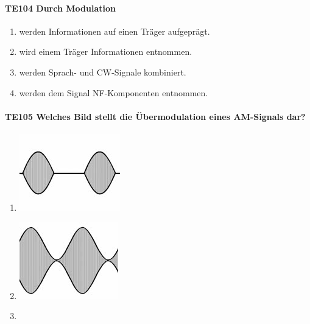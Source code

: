 \documentclass[8pt]{article}
\begin{document}
\begin{enumerate}
\begin{enumerate}[nolistsep,label=\Alph*]
\paragraph*{TE104 Durch Modulation}
\begin{enumerate}[nolistsep,label=\Alph*]
\item werden Informationen auf einen Träger aufgeprägt.
\item wird einem Träger Informationen entnommen.
\item werden Sprach- und CW-Signale kombiniert.
\item werden dem Signal NF-Komponenten entnommen.
\end{enumerate}

\paragraph*{TE105 Welches Bild stellt die Übermodulation eines AM-Signals dar?}
\begin{enumerate}[nolistsep,label=\Alph*]
\item
\begin{center}
	\begin{minipage}{\linewidth}
		\centering
		\includegraphics[scale=1.0]{pics/te105_a.jpg}
	\end{minipage}
\end{center}
\item
\begin{center}
	\begin{minipage}{\linewidth}
		\centering
		\includegraphics[scale=1.0]{pics/te105_b.jpg}
	\end{minipage}
\end{center}
\item
\begin{center}
	\begin{minipage}{\linewidth}

\end{minipage}
\end{center}
\end{enumerate}
\end{enumerate}
\end{enumerate}
\end{document}
